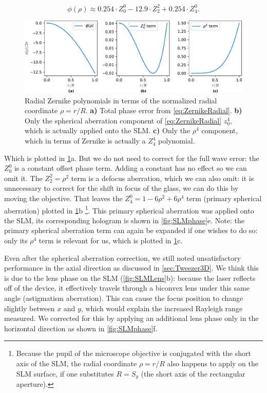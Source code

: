 \begin{equation}\label{eq:ZernikeExpansion}
    \phi(\rho) \approx 0.254 \cdot Z_0^0 - 12.9 \cdot Z_2^2 + 0.254\cdot Z_4^0.
\end{equation}
\begin{figure}
    \centering
    \includegraphics[width=\textwidth]{figures/SphericalAberrationTerms.pdf}
    \caption{
    Radial Zernike polynomials in terms of the normalized radial coordinate $\rho = r/R$.
    \textsf{\textbf{a)}} Total phase error from \cref{eq:ZernikeRadial}.
    \textsf{\textbf{b)}} Only the spherical aberration component of \cref{eq:ZernikeRadial} $z_0^4$, which is actually applied onto the SLM.
    \textsf{\textbf{c)}} Only the $\rho^4$ component, which in terms of Zernike is actually a $Z_4^4$ polynomial.
    }
    \label{fig:AberrationTerm}
\end{figure}
Which is plotted in \cref{fig:AberrationTerm}a.
But we do not need to correct for the full wave error: the $Z_0^0$ is a constant offset phase term. 
Adding a constant has no effect so we can omit it. 
The $Z_2^2 = \rho^2$ term is a defocus aberration, which we can also omit: it is unnecessary to correct for the shift in focus of the glass, we can do this by moving the objective. 
That leaves the $Z_4^0 = 1 - 6\rho^2+6\rho^4$ term (primary spherical aberration) plotted in \cref{fig:AberrationTerm}b \footnote{Because the pupil of the microscope objective is conjugated with the short axis of the SLM, the radial coordinate $\rho =r/R$ also happens to apply on the SLM surface, if one substitutes $R=S_y$ (the short axis of the rectangular aperture).}.
This primary spherical aberration was applied onto the SLM, its corresponding hologram is shown in \cref{fig:SLMphase}e.
Note: the primary spherical aberration term can again be expanded if one wishes to do so: only its $\rho^4$ term is relevant for us, which is plotted in \cref{fig:AberrationTerm}c. 


Even after the spherical aberration correction, we still noted unsatisfactory performance in the axial direction as discussed in \cref{sec:Tweezer3D}. 
We think this is due to the lens phase on the SLM (\cref{fig:SLMLens}b): because the laser reflects off of the device, it effectively travels through a biconvex lens under this same angle (astigmatism aberration). 
This can cause the focus position to change slightly between $x$ and $y$, which would explain the increased Rayleigh range measured. 
We corrected for this by applying an additional lens phase only in the horizontal direction as shown in \cref{fig:SLMphase}f.


